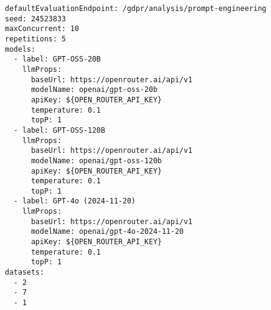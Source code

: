 \begin{lstlisting}[caption={Konfigurationsdatei des Experiments mit GPT Modellen}, label={lst:gpt-experiment-config}]
defaultEvaluationEndpoint: /gdpr/analysis/prompt-engineering
seed: 24523833
maxConcurrent: 10
repetitions: 5
models:
  - label: GPT-OSS-20B
    llmProps:
      baseUrl: https://openrouter.ai/api/v1
      modelName: openai/gpt-oss-20b
      apiKey: ${OPEN_ROUTER_API_KEY}
      temperature: 0.1
      topP: 1
  - label: GPT-OSS-120B
    llmProps:
      baseUrl: https://openrouter.ai/api/v1
      modelName: openai/gpt-oss-120b
      apiKey: ${OPEN_ROUTER_API_KEY}
      temperature: 0.1
      topP: 1
  - label: GPT-4o (2024-11-20)
    llmProps:
      baseUrl: https://openrouter.ai/api/v1
      modelName: openai/gpt-4o-2024-11-20
      apiKey: ${OPEN_ROUTER_API_KEY}
      temperature: 0.1
      topP: 1
datasets:
  - 2
  - 7
  - 1
\end{lstlisting}
